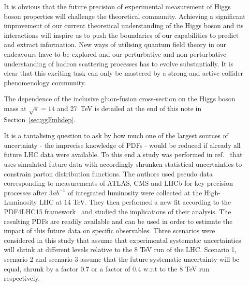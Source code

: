It is obvious that the future precision of experimental measurement of Higgs boson properties will challenge the theoretical community.
Achieving a significant improvement of our current theoretical understanding of the Higgs boson and its interactions will inspire us to push the boundaries of our capabilities to predict and extract information.
New ways of utilising quantum field theory in our endeavours have to be explored and our perturbative and non-perturbative understanding of hadron scattering processes has to evolve substantially. 
It is clear that this exciting task can only be mastered by a strong and active collider phenomenology community.
 
The dependence of the inclusive gluon-fusion cross-section on the Higgs boson mass at $\sqrt{s}=14$ and 27~TeV
is detailed at the end of this note in Section~\ref{sec:ggFmhdep}.


It is a tantalising question to ask by how much one of the largest sources of uncertainty - the imprecise knowledge of PDFs - would be reduced if already all future LHC data were available.
To this end a study was performed in ref.~\cite{Khalek:2018mdn} that uses simulated future data with accordingly shrunken statistical uncertainties to constrain parton distribution functions.
The authors used pseudo data corresponding to measurements of ATLAS, CMS and LHCb for key precision processes after $3 ab^{-1}$ of integrated luminosity were collected at the High-Luminosity LHC at 14 TeV.
They then performed a new fit according to the PDF4LHC15 framework~\cite{Botje:2011sn} and studied the implications of their analysis.
The resulting PDFs are readily available and can be used in order to estimate the impact of this future data on specific observables. 
Three scenarios were considered in this study that assume that experimental systematic uncertainties will shrink at different levels relative to the 8 TeV run of the LHC.
Scenario 1, scenario 2 and scenario 3 assume that the future systematic uncertainty will be equal, shrunk by a factor $0.7$ or a factor of $0.4$ w.r.t to the 8 TeV run respectively.

